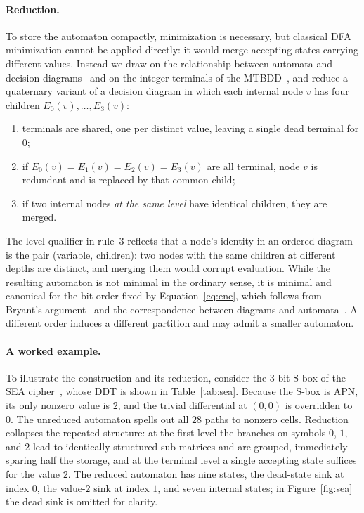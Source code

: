 \documentclass[runningheads]{llncs}
\begin{document}
\paragraph{Reduction.}
To store the automaton compactly, minimization is necessary, but classical DFA
minimization cannot be applied directly: it would merge accepting states carrying
different values. Instead we draw on the relationship between automata and
decision diagrams~\cite{KimuraAndClarke1990} and on the integer terminals of the
MTBDD~\cite{FujitaEtAl1997}, and reduce a quaternary variant of a decision diagram in which
each internal node $v$ has four children $E_0(v),\dots,E_3(v)$:
\begin{enumerate}
  \item terminals are shared, one per distinct value, leaving a single dead
        terminal for $0$;
  \item if $E_0(v)=E_1(v)=E_2(v)=E_3(v)$ are all terminal, node $v$ is redundant and is replaced by
        that common child;
  \item if two internal nodes \emph{at the same level} have identical children,
        they are merged.
\end{enumerate}
The level qualifier in rule~3 reflects that a node's identity in an ordered diagram
is the pair (variable, children): two nodes with the same children at different
depths are distinct, and merging them would corrupt evaluation. While the
resulting automaton is not minimal in the ordinary sense, it is minimal and
canonical for the bit order fixed by Equation~\eqref{eq:enc}, which follows from
Bryant's argument~\cite{Bryant1986} and the correspondence between diagrams and
automata~\cite{KimuraAndClarke1990}. A different order induces a different
partition and may admit a smaller automaton.

\paragraph{A worked example.}
To illustrate the construction and its reduction, consider the $3$-bit S-box of
the SEA cipher~\cite{StandaertEtAl2006}, whose DDT is shown in Table~\ref{tab:sea}. Because the S-box is
APN, its only nonzero value is $2$, and the trivial differential at $(0,0)$ is
overridden to $0$. The unreduced automaton spells out all $28$ paths to nonzero
cells. Reduction collapses the repeated structure: at the first level the
branches on symbols $0$, $1$, and $2$ lead to identically structured
sub-matrices and are grouped, immediately sparing half the storage, and at the
terminal level a single accepting state suffices for the value $2$. The reduced
automaton has nine states, the dead-state sink at index $0$, the value-$2$ sink
at index $1$, and seven internal states; in Figure~\ref{fig:sea} the dead sink
is omitted for clarity.
\end{document}
